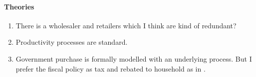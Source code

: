 \documentclass[12pt]{article}
\numberwithin{equation}{section}
\begin{document}
\paragraph{Theories} 
\begin{enumerate}
    \item There is a wholesaler and retailers which I think are kind of redundant?
    \item Productivity processes are standard.
    \item Government purchase is formally modelled with an underlying process. But I prefer the fiscal policy as tax and rebated to household as in \citep{laoOptimalMonetaryPolicy2022}.
\end{enumerate}




\end{document}
